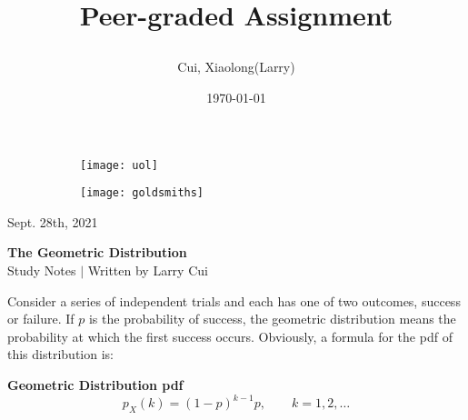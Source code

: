 \documentclass[11pt]{article}
\title{\vspace{-90pt} 



\textbf  {Peer-graded Assignment} }
\author{Cui, Xiaolong(Larry)}
\date{\today}
\begin{document}

\thispagestyle{plain}


\begin{figure}[H] %
  \begin{subfigure}{0.3\textwidth}
    \texttt{[image: uol]}
  \end{subfigure}
  \hfill
  \begin{subfigure}{0.3\textwidth}
    \texttt{[image: goldsmiths]}
  \end{subfigure}
\end{figure}


\begin{flushright}

\footnotesize {Sept. 28th,  2021}
\end{flushright}

\begin{center}
\textbf{The Geometric Distribution} \\
\footnotesize {Study Notes $ | $ Written by Larry Cui}
\end{center}





\setcounter{figure}{0}

\vspace{10pt}


Consider a series of independent trials and each has one of two outcomes,  success or failure.  If $p$ is the probability of success,  the geometric distribution means the probability at which the first success occurs.  Obviously,  a formula for the pdf of this distribution is:

\begin{tcolorbox}[
	enhanced, 
	width=\textwidth, 
	fontupper=\normalsize,%
	drop fuzzy shadow southwest,
	boxrule=0.4pt,
	sharp corners,
	colframe=yellow!80!black,
	colback=yellow!10]
	
\textbf{\color{RoyalBlue} Geometric Distribution pdf} 
\[ 
p_X (k) = (1-p)^{k-1} p ,  \qquad k = 1, 2,  \dots
\]

\end{tcolorbox}
\end{document}
